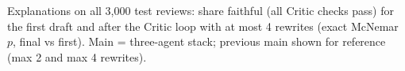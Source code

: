 \begin{table}[htbp]
\centering
\caption{Explanations on all 3,000 test reviews: share faithful (all Critic checks pass) for the first draft and after the Critic loop with at most 4 rewrites (exact McNemar $p$, final vs first). Main = three-agent stack; previous main shown for reference (max 2 and max 4 rewrites).}
\label{tab:e23faith}
\small
\resizebox{\linewidth}{!}{%
}
\end{table}
